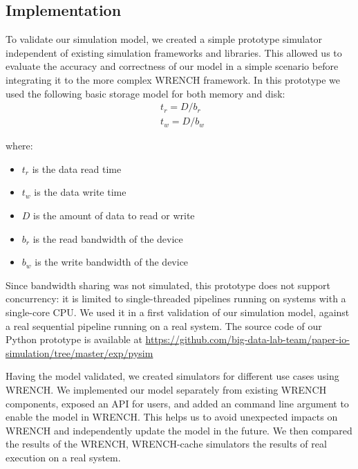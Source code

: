 \documentclass[conference]{IEEEtran}
\begin{document}
        \subsection{Implementation}

            To validate our simulation model, we created a simple prototype
            simulator independent of existing simulation frameworks and libraries. 
            This allowed us to evaluate the accuracy and correctness of our 
            model in a simple scenario before integrating it to the more complex 
            WRENCH framework. 
            In this prototype we used the following basic storage model for 
            both memory and disk: 
            \begin{align*}
                & t_{r} = D / b_r \\ 
                & t_{w} = D / b_w\
            \end{align*}        
            
            where:
            \begin{itemize}
                \item $t_{r}$ is the data read time
                \item $t_{w}$ is the data write time
                \item $D$ is the amount of data to read or write
                \item $b_r$ is the read bandwidth of the device
                \item $b_w$ is the write bandwidth of the device
            \end{itemize}            

            Since bandwidth sharing was not simulated, this prototype does not support
            concurrency: it is limited to single-threaded pipelines running on systems
            with a single-core CPU. We used it in a first validation of our simulation
            model, against a real sequential pipeline running on a real system.
            The source code of our Python prototype is available at
            \url{https://github.com/big-data-lab-team/paper-io-simulation/tree/master/exp/pysim}

            Having the model validated, we created simulators for different use cases
            using WRENCH.
            We implemented our model separately from existing WRENCH components,
            exposed an API for users, and added an command line argument to enable
            the model in WRENCH.
            This helps us to avoid unexpected impacts on WRENCH and
            independently update the model in the future.
            We then compared the results of the WRENCH, WRENCH-cache simulators
            the results of real execution on a real system.
\end{document}
